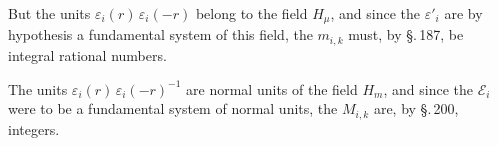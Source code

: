 But the units $\varepsilon_i(r)\, \varepsilon_i(-r)$ belong to the field $H_\mu$,
and since the $\varepsilon'_i$ are by hypothesis a fundamental system
of this field, the $m_{i,k}$ must, by \S.\,187, be integral rational
 numbers.

The units $\varepsilon_i(r)\, \varepsilon_i(-r)^{-1}$ are normal units of the field
 $H_m$, and since the $\mathcal{E}_i$ were to be a fundamental system of normal
 units, the $M_{i,k}$ are, by \S.\,200, integers.

